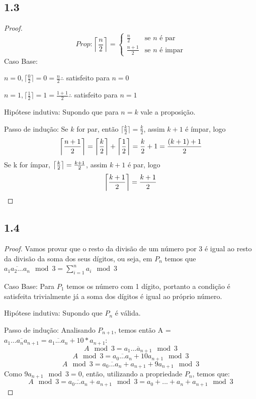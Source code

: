 \documentclass{article}
\DeclarePairedDelimiter\ceil{\lceil}{\rceil}
\begin{document}
\subsection*{1.3}
\begin{proof}
$ $\newline
  \[Prop:
    \left \lceil\frac{n}{2} \right \rceil=
    \left\{
    \begin{array}{ll}
    \frac{n}{2}& \textrm{se $n$ é par}\\
    \frac{n+1}{2}& \textrm{se $n$ é impar}
    \end{array}
    \right.
  \]
Caso Base: 

$n=0,\lceil\frac{0}{2}\rceil=0=\frac{n}{2}\therefore$ satisfeito para $n=0$

$n=1,\lceil\frac{1}{2}\rceil=1=\frac{1+1}{2}\therefore$ satisfeito para $n=1$

Hipótese indutiva: Supondo que para $n=k$ vale a proposição.

Passo de indução: Se $k$ for par, então $\lceil\frac{k}{2} \rceil = \frac{k}{2}$, assim
$k+1$ é ímpar, logo
$$
\ceil*{\frac{n+1}{2}} = \ceil*{\frac{k}{2}} + \ceil*{\frac{1}{2}} =\frac{k}{2}+1 = \frac{(k+1)+1}{2}
$$
Se k for ímpar, $\ceil*{\frac{k}{2}} = \frac{k+1}{2}$, assim $k+1$ é par, logo
$$\ceil*{\frac{k+1}{2}}=\frac{k+1}{2}$$
\end{proof}


\subsection*{1.4}
\begin{proof}
Vamos provar que o resto da divisão de um número por 3 é igual ao resto da divisão da soma
dos seus dígitos, ou seja, em $P_n$ temos que $\overline{a_1a_2...a_n} \mod 3 = \sum_{i=1}^n{a_i} \mod 3$

Caso Base: Para $P_1$ temos os número com 1 dígito, portanto a condição é satisfeita trivialmente já
a soma dos dígitos é igual ao próprio número.

Hipótese indutiva: Supondo que $P_n$ é válida.

Passo de indução: Analisando $P_{n+1}$, temos então A = $\overline{a_1...a_na_{n+1}} = \overline{a_1...a_n}+10*a_{n+1}$:
$$A \mod 3 = \overline{a_1...a_{n+1}} \mod 3$$
$$A \mod 3 = \overline{a_0...a_n} + 10a_{n+1} \mod 3$$
$$A \mod 3 = \overline{a_0...a_n} + a_{n+1} +9a_{n+1} \mod 3$$
Como $9a_{n+1} \mod 3 = 0$, então, utilizando a propriedade $P_n$, temos que:
$$A \mod 3 = \overline{a_0...a_n} + a_{n+1} \mod 3 = a_0 + ... + a_n + a_{n+1} \mod 3$$
\end{proof}
\end{document}

